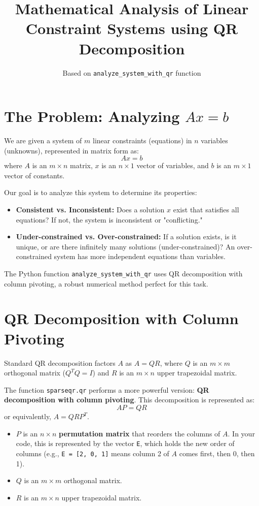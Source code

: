 \documentclass[11pt, a4paper]{article}
\title{Mathematical Analysis of Linear Constraint Systems using QR Decomposition}
\author{Based on \texttt{analyze\_system\_with\_qr} function}
\date{}
\begin{document}
\maketitle

\section{The Problem: Analyzing $Ax = b$}

We are given a system of $m$ linear constraints (equations) in $n$ variables (unknowns), represented in matrix form as:
$$
Ax = b
$$
where $A$ is an $m \times n$ matrix, $x$ is an $n \times 1$ vector of variables, and $b$ is an $m \times 1$ vector of constants.

Our goal is to analyze this system to determine its properties:
\begin{itemize}
    \item \textbf{Consistent vs. Inconsistent:} Does a solution $x$ exist that satisfies all equations? If not, the system is inconsistent or "conflicting."
    \item \textbf{Under-constrained vs. Over-constrained:} If a solution exists, is it unique, or are there infinitely many solutions (under-constrained)? An over-constrained system has more independent equations than variables.
\end{itemize}
The Python function \texttt{analyze\_system\_with\_qr} uses QR decomposition with column pivoting, a robust numerical method perfect for this task.

\section{QR Decomposition with Column Pivoting}

Standard QR decomposition factors $A$ as $A = QR$, where $Q$ is an $m \times m$ orthogonal matrix ($Q^T Q = I$) and $R$ is an $m \times n$ upper trapezoidal matrix.

The function \texttt{sparseqr.qr} performs a more powerful version: \textbf{QR decomposition with column pivoting}. This decomposition is represented as:
$$
AP = QR
$$
or equivalently, $A = QRP^T$.
\begin{itemize}
    \item $P$ is an $n \times n$ \textbf{permutation matrix} that reorders the columns of $A$. In your code, this is represented by the vector \texttt{E}, which holds the new order of columns (e.g., \texttt{E = [2, 0, 1]} means column 2 of $A$ comes first, then 0, then 1).
    \item $Q$ is an $m \times m$ orthogonal matrix.
    \item $R$ is an $m \times n$ upper trapezoidal matrix.
\end{itemize}
\end{document}
